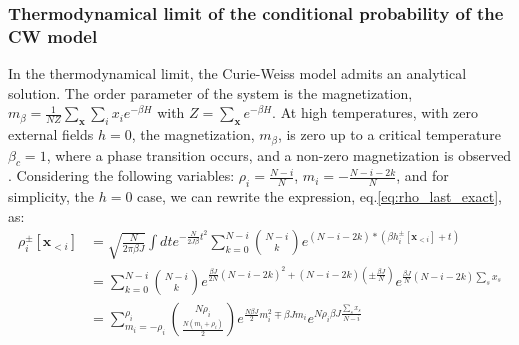\documentclass[10pt, notitlepage]{revtex4-2}
\begin{document}
\subsubsection{Thermodynamical limit of the conditional probability of the CW model}
In the thermodynamical limit, the Curie-Weiss model admits an analytical solution. The order parameter of the system is the magnetization, $m_{\beta}=\frac{1}{N Z}\sum_{\mathbf{x}}\sum_i x_i e^{-\beta H}$ with $Z = \sum_{\mathbf{x}} e^{-\beta H}$. At high temperatures, with zero external fields $h=0$, the magnetization, $m_{\beta}$, is zero up to a critical temperature $\beta_c=1$, where a phase transition occurs, and a non-zero magnetization is observed \cite{kadanoff2000statistical}. Considering the following variables: $\rho_i = \frac{N-i}{N}$, $m_i = -\frac{N-i-2k}{N}$, and for simplicity, the $h=0$ case, we can rewrite the expression, eq.\ref{eq:rho_last_exact}, as:
\begin{align}
    \rho_i^{\pm}[\mathbf{x}_{<i}] &= \sqrt{\frac{N}{2\pi \beta J}}\int dt e^{-\frac{N}{2J \beta}t^{2}} 
    \sum_{k=0}^{N-i} \binom{N-i}{k} e^{(N-i-2k)*(\beta h_i^{\pm}[\mathbf{x}_{<i}] + t)}\\ \label{eq:rho_last_exact2} &= \sum_{k=0}^{N-i} \binom{N-i}{k}e^{\frac{\beta J}{2N}\left(N-i-2k\right)^{2}+\left(N-i-2k\right)\left(\pm\frac{\beta J}{N}\right)} e^{\frac{\beta J}{N}\left(N-i-2k\right) \sum_s x_s}  \\
    &= \sum_{m_i=-\rho_i}^{\rho_i} \binom{N\rho_i}{\frac{N(m_i+\rho_i)}{2}} e^{\frac{N \beta J}{2}m_i^{2} \mp \beta J m_i } e^{N \rho_i \beta J \frac{\sum_s x_s}{N-i}}
\end{align}    
\end{document}
